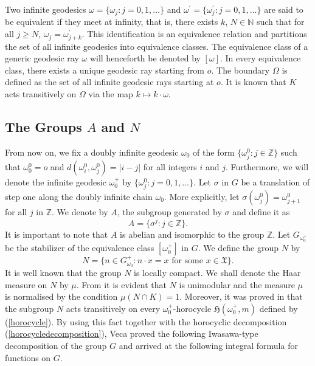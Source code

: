 \documentclass[12pt,reqno]{amsart}
\newcommand{\N}{\mathbb N}
\theoremstyle{definition}
\theoremstyle{definition}
\numberwithin{equation}{section}
\begin{document}
Two infinite geodesics $\omega=\{\omega_j:j=0,1,\ldots\}$ and $\omega^{\prime}=\{\omega^{\prime}_j:j=0,1,\ldots\}$ are said to be equivalent if they meet at infinity, that is, there exists  $k$, $N \in \N $ such that for all $ j\geq N$, $\omega_j =\omega^{\prime}_{j+k}$. This identification is an equivalence relation and partitions the set of all infinite geodesics into equivalence classes. The equivalence class of a generic geodesic ray $\omega$ will henceforth be denoted by $[\omega]$. In every equivalence class, there exists a unique geodesic ray starting from $o$. The boundary $\Omega$ is defined as the set of all infinite geodesic rays starting at $o$. It is known that $K$ acts transitively on $\Omega$ via the map $k\mapsto k\cdot\omega$.

\subsection{The Groups \texorpdfstring{$A$}{A} and \texorpdfstring{$N$}{N}}
From now on, we fix a doubly infinite geodesic $\omega_{0}$ of the form $\{\omega^{0}_{j}:j\in\mathbb{Z}\}$ such that $\omega^{0}_{0}=o$ and $d(\omega^{0}_i, \omega^{0}_j)=|i-j|$ for all integers $i$ and $j$. Furthermore, we will denote the infinite geodesic $\omega^{+}_{0}$ by $\{\omega^{0}_{j}:j=0,1,\ldots\}$. Let $\sigma$ in $G$ be a translation of step one along the doubly infinite chain $\omega_{0}$. More explicitly, let $\sigma(\omega^{0}_{j})=\omega^{0}_{j+1}$ for all $j$ in $\mathbb{Z}$. We denote by $A$, the subgroup generated by $\sigma$ and define it as
$$A=\{\sigma^{j}:j\in\mathbb{Z}\}.$$
It is important to note that $A$ is abelian and isomorphic to the group $\mathbb{Z}$. Let $G_{\omega^{+}_{0}}$ be the stabilizer of the equivalence class $[\omega^{+}_{0}]$ in $G$. We define the group $N$ by
\begin{equation}\label{groupn}
N=\{n\in G^{+}_{\omega_{0}}:n\cdot x=x\text{ for some }x\in\mathfrak{X}\}.
\end{equation}
It is well known that the group $N$ is locally compact. We shall denote the Haar measure on $N$ by $\mu$. From \cite[Lemma 3.3]{Alessandro_2002} it is evident that $N$ is unimodular and the measure $\mu$ is normalised by the condition $\mu(N\cap K)=1$. Moreover, it was proved in \cite[Corollary 3.2]{Alessandro_2002} that the subgroup $N$ acts transitively on every $\omega^{+}_{0}$-horocycle $\mathfrak{H}(\omega^{+}_{0},m)$ defined by (\ref{horocycle}). By using this fact together with the horocyclic decomposition (\ref{horocycledecomposition}), Veca \cite[Theorem 3.5]{Alessandro_2002} proved the following Iwasawa-type decomposition of the group $G$ and arrived at the following integral formula for functions on $G$.
\end{document}

